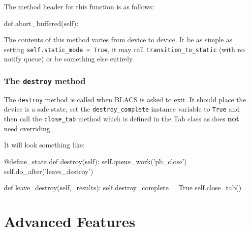 \documentclass[12pt]{article}
\begin{document}
The method header for this function is as follows:
\begin{python}
    def abort_buffered(self):
\end{python}

The contents of this method varies from device to device. It be as simple as setting \texttt{self.static\_mode = True}, it may call \texttt{transition\_to\_static} (with no notify queue) or be something else entirely.

\subsubsection{The \texttt{destroy} method}\label{device_class_destroy}
The \texttt{destroy} method is called when BLACS is asked to exit. It should place the device is a safe state, set the \texttt{destroy\_complete} instance variable to \texttt{True} and then call the \texttt{close\_tab} method which is defined in the Tab class as does \textbf{not} need overriding. 

It will look something like:
\begin{python}
    @define_state
    def destroy(self):        
        self.queue_work('pb_close')
        self.do_after('leave_destroy')
        
    def leave_destroy(self,_results):
        self.destroy_complete = True
        self.close_tab()
\end{python}

\section{Advanced Features}
\end{document}
